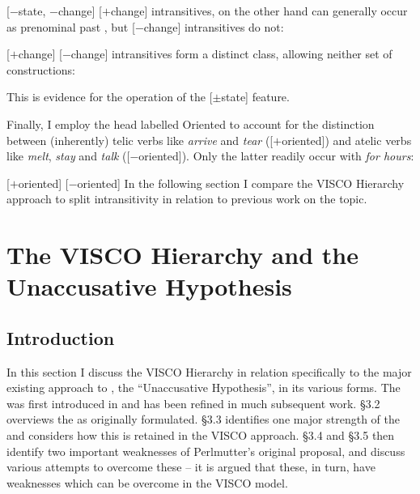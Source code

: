 \documentclass[output=paper]{langsci/langscibook}
\begin{document}
\ea
    \ea {}[$-$state, $-$change]
        \z
    \ex {}[$+$change]
        \z
    \z
\z
[$+$change] intransitives, on the other hand can generally occur as prenominal
past , but [$-$change] intransitives do not:

\ea
    \ea {}[$+$change]
        \z
    \ex {}[$-$change]
        \z
    \z
\z
[$+$state] intransitives form a distinct class, allowing neither set of
constructions:

\ea
    \z
\z
This is evidence for the operation of the [$\pm$state] feature.

\largerpage
Finally, I employ the head labelled Oriented to account for the distinction
between (inherently) telic verbs like \emph{arrive} and \emph{tear}
([$+$oriented]) and atelic verbs like \emph{melt}, \emph{stay} and
\emph{talk} ([$-$oriented]). Only the latter readily occur with \emph{for
hours}:

\ea
    \ea {}[$+$oriented]
        \z
    \ex {}[$-$oriented]
        \z
    \z
\z
In the following section I compare the VISCO Hierarchy approach to split
intransitivity in relation to previous work on the topic.

\section{The VISCO Hierarchy and the Unaccusative Hypothesis}\label{sec:unacc}

\subsection{Introduction}

In this section I discuss the VISCO Hierarchy in relation specifically to the
major existing approach to , the \enquote{Unaccusative
Hypothesis}, in its various forms. The  was first
introduced in \citet{Perlmutter1978} and has been refined in much subsequent
work. §3.2 overviews the  as originally formulated. §3.3
identifies one major strength of the  and considers how
this is retained in the VISCO approach. §3.4 and §3.5 then identify two
important weaknesses of Perlmutter’s original proposal, and discuss various
attempts to overcome these -- it is argued that these, in turn, have
weaknesses which can be overcome in the VISCO model.
\end{document}
